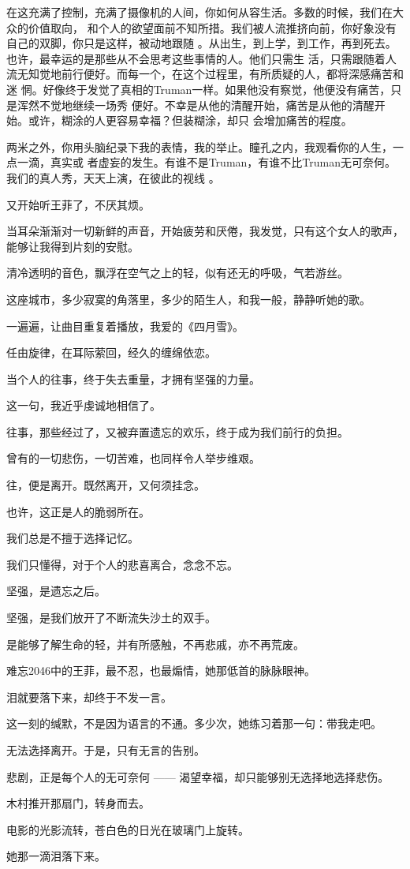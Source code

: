 \documentclass[12pt,a4paper]{article}
\begin{document}
		在这充满了控制，充满了摄像机的人间，你如何从容生活。多数的时候，我们在大众的价值取向，
	和个人的欲望面前不知所措。我们被人流推挤向前，你好象没有自己的双脚，你只是这样，被动地跟随
	。从出生，到上学，到工作，再到死去。也许，最幸运的是那些从不会思考这些事情的人。他们只需生
	活，只需跟随着人流无知觉地前行便好。而每一个，在这个过程里，有所质疑的人，都将深感痛苦和迷
	惘。好像终于发觉了真相的Truman一样。如果他没有察觉，他便没有痛苦，只是浑然不觉地继续一场秀
	便好。不幸是从他的清醒开始，痛苦是从他的清醒开始。或许，糊涂的人更容易幸福？但装糊涂，却只
	会增加痛苦的程度。

		两米之外，你用头脑纪录下我的表情，我的举止。瞳孔之内，我观看你的人生，一点一滴，真实或
	者虚妄的发生。有谁不是Truman，有谁不比Truman无可奈何。我们的真人秀，天天上演，在彼此的视线
	。

	\endwriting



		又开始听王菲了，不厌其烦。\par
		当耳朵渐渐对一切新鲜的声音，开始疲劳和厌倦，我发觉，只有这个女人的歌声，能够让我得到片刻的安慰。\par
		清冷透明的音色，飘浮在空气之上的轻，似有还无的呼吸，气若游丝。\par
		这座城市，多少寂寞的角落里，多少的陌生人，和我一般，静静听她的歌。\par
		一遍遍，让曲目重复着播放，我爱的《四月雪》。\par
		任由旋律，在耳际萦回，经久的缠绵依恋。

		当个人的往事，终于失去重量，才拥有坚强的力量。

		这一句，我近乎虔诚地相信了。\par
		往事，那些经过了，又被弃置遗忘的欢乐，终于成为我们前行的负担。\par
		曾有的一切悲伤，一切苦难，也同样令人举步维艰。\par
		往，便是离开。既然离开，又何须挂念。\par
		也许，这正是人的脆弱所在。\par
		我们总是不擅于选择记忆。\par
		我们只懂得，对于个人的悲喜离合，念念不忘。\par
		坚强，是遗忘之后。\par
		坚强，是我们放开了不断流失沙土的双手。\par
		是能够了解生命的轻，并有所感触，不再悲戚，亦不再荒废。

		难忘2046中的王菲，最不忍，也最煽情，她那低首的脉脉眼神。\par
		泪就要落下来，却终于不发一言。\par
		这一刻的缄默，不是因为语言的不通。多少次，她练习着那一句：带我走吧。\par
		无法选择离开。于是，只有无言的告别。\par
		悲剧，正是每个人的无可奈何 —— 渴望幸福，却只能够别无选择地选择悲伤。\par
		木村推开那扇门，转身而去。\par
		电影的光影流转，苍白色的日光在玻璃门上旋转。\par
		她那一滴泪落下来。
\end{document}
